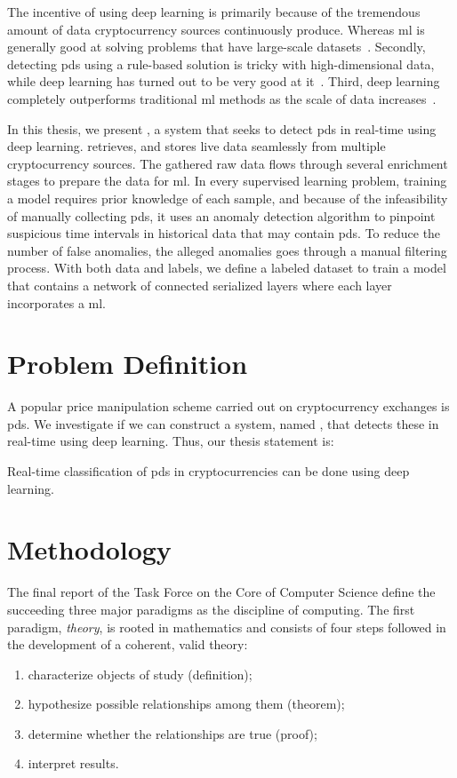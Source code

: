 The incentive of using deep learning is primarily because of the tremendous amount of data cryptocurrency sources continuously produce. Whereas \ac{ml} is generally good at solving problems that have large-scale datasets~\cite{aws}. Secondly, detecting \acp{pd} using a rule-based solution is tricky with high-dimensional data, while deep learning has turned out to be very good at it~\cite{lecun2015deep}. Third, deep learning completely outperforms traditional \ac{ml} methods as the scale of data increases~\cite{dl_intrusion, peng2015multi}. 

In this thesis, we present \project, a system that seeks to detect \acp{pd} in real-time using deep learning. \project retrieves, and stores live data seamlessly from multiple cryptocurrency sources. The gathered raw data flows through several enrichment stages to prepare the data for \ac{ml}. In every supervised learning problem, training a model requires prior knowledge of each sample, and because of the infeasibility of manually collecting \acp{pd}, it uses an anomaly detection algorithm to pinpoint suspicious time intervals in historical data that may contain \acp{pd}. To reduce the number of false anomalies, the alleged anomalies goes through a manual filtering process. With both data and labels, we define a labeled dataset to train a model that contains a network of connected serialized layers where each layer incorporates a \ac{ml}.

\section{Problem Definition}\label{sec:problem_definition}
A popular price manipulation scheme carried out on cryptocurrency exchanges is \acp{pd}. We investigate if we can construct a system, named \project, that detects these in real-time using deep learning. Thus, our thesis statement is:

\begin{displayquote}
    \begin{em}
    Real-time classification of \acfp{pd} in cryptocurrencies can be done using deep learning.
    \end{em}
\end{displayquote}


\section{Methodology}\label{sec:methodology}
The final report of the Task Force on the Core of Computer Science\cite{computing_as_a_discipline} define the succeeding three major paradigms as the discipline of computing. The first paradigm, \emph{theory}, is rooted in mathematics and consists of four steps followed in the development of a coherent, valid theory: 
\begin{enumerate}
    \item characterize objects of study (definition);
    \item hypothesize possible relationships among them (theorem);
    \item determine whether the relationships are true (proof); 
    \item interpret results.
\end{enumerate}


